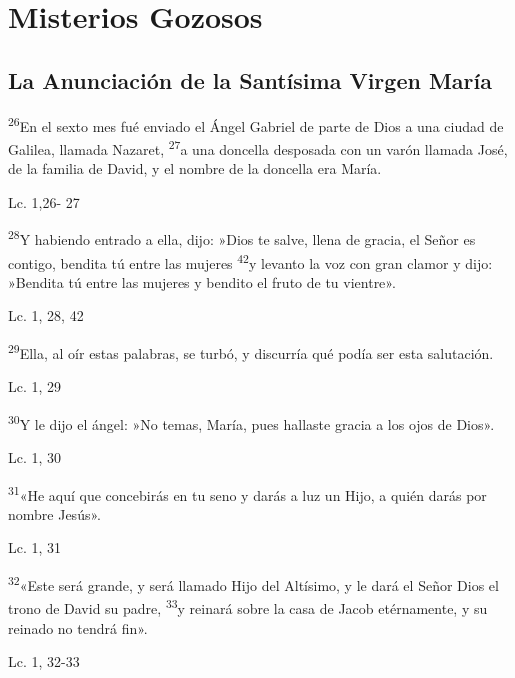 \documentclass[a4paper,11pt]{article}
\begin{document}
  \section*{\hfil Misterios Gozosos \hfil}
    
    \subsection*{\hfil La Anunciación de la Santísima Virgen María \hfil}

      \textsuperscript{26}En el sexto mes fué enviado el Ángel Gabriel de parte de Dios a una ciudad de Galilea, llamada Nazaret, \textsuperscript{27}a una 
      doncella desposada con un varón llamada José, de la familia de David, y el nombre de la doncella era María.
      \begin{flushright}
        Lc. 1,26- 27
      \end{flushright}

      \textsuperscript{28}Y habiendo entrado a ella, dijo: »Dios te salve, llena de gracia, el Señor es contigo, bendita tú entre las mujeres 
      \textsuperscript{42}y levanto la voz con gran clamor y dijo: »Bendita tú entre las mujeres y bendito el fruto de tu vientre».
      \begin{flushright}
        Lc. 1, 28, 42
      \end{flushright}

      \textsuperscript{29}Ella, al oír estas palabras, se turbó, y discurría qué podía ser esta salutación.
      \begin{flushright}
        Lc. 1, 29
      \end{flushright}

      \textsuperscript{30}Y le dijo el ángel: »No temas, María, pues hallaste gracia a los ojos de Dios».
      \begin{flushright}
        Lc. 1, 30
      \end{flushright}

      \textsuperscript{31}«He aquí que concebirás en tu seno y darás a luz un Hijo, a quién darás por nombre Jesús».
      \begin{flushright}
        Lc. 1, 31
      \end{flushright}

      \textsuperscript{32}«Este será grande, y será llamado Hijo del Altísimo, y le dará el Señor Dios el trono de David su padre, \textsuperscript{33}y reinará
      sobre la casa de Jacob etérnamente, y su reinado no tendrá fin».
      \begin{flushright}
        Lc. 1, 32-33
      \end{flushright}
\end{document}
